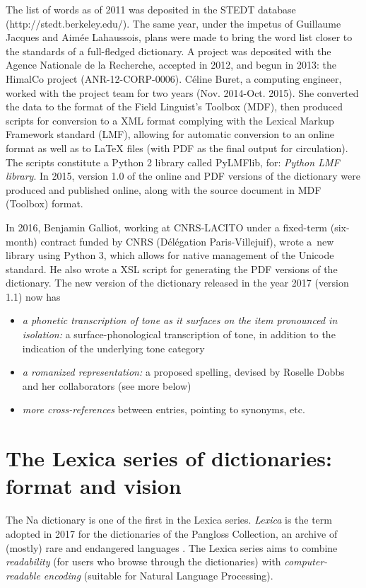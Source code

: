 The list of words as of 2011 was deposited in the STEDT database (http://stedt.berkeley.edu/). The same year, under the impetus of Guillaume Jacques and Aimée Lahaussois, plans were made to bring the word list closer to the standards of a full-fledged dictionary. A project was deposited with the Agence Nationale de la Recherche, accepted in 2012, and begun in 2013: the HimalCo project (ANR-12-CORP-0006). Céline Buret, a computing engineer, worked with the project team for two years (Nov. 2014-Oct. 2015). She converted the data to the format of the Field Linguist's Toolbox (MDF), then produced scripts for conversion to a XML format complying with the Lexical Markup Framework standard (LMF), allowing for automatic conversion to an online format as well as to LaTeX files (with PDF as the final output for circulation). The scripts constitute a Python 2 library called PyLMFlib, for: \textit{Python LMF library}. In 2015, version 1.0 of the online and PDF versions of the dictionary were produced and published online, along with the source document in MDF (Toolbox) format.

In 2016, Benjamin Galliot, working at CNRS-LACITO under a fixed-term (six-month) contract funded by CNRS (Délégation Paris-Villejuif), wrote a~new library using Python 3, which allows for native management of the Unicode standard. He also wrote a XSL script for generating the PDF versions of the dictionary. The new version of the dictionary released in the year 2017 (version 1.1) now has 

\begin{itemize}
	\item \textit{a phonetic transcription of tone as it surfaces on the item pronounced in isolation:} a surface-phonological transcription of tone, in addition to the indication of the underlying tone category
	\item \textit{a romanized representation:} a proposed spelling, devised by Roselle Dobbs and her collaborators (see more below)
	\item \textit{more cross-references} between entries, pointing to synonyms, etc.
\end{itemize}

\section{The Lexica series of dictionaries: format and vision} \label{sec:format}

The Na dictionary is one of the first in the Lexica series. \textit{Lexica} is the term adopted in 2017 for the dictionaries of the Pangloss Collection, an archive of (mostly) rare and endangered languages \citep{michailovskyetal2014}. The Lexica series aims to combine \textit{readability} (for users who browse through the dictionaries) with \textit{computer-readable encoding} (suitable for Natural Language Processing). 

